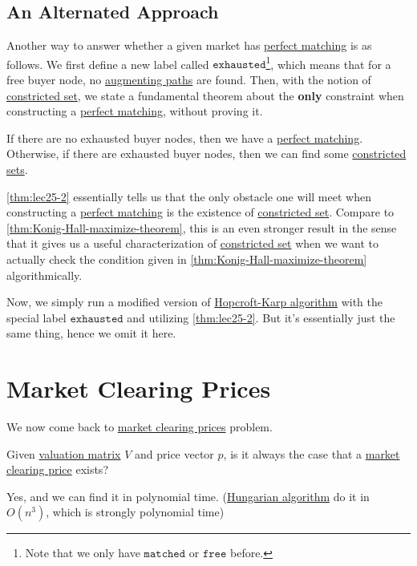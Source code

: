 \subsection{An Alternated Approach}
Another way to answer whether a given market has \hyperref[def:perfect-matching]{perfect matching} is as follows. We first define a new label called \(\mathtt{exhausted}\)\footnote{Note that we only have \(\mathtt{matched}\) or \(\mathtt{free}\) before.}, which means that for a free buyer node, no \hyperref[def:augmenting-path]{augmenting paths} are found. Then, with the notion of \hyperref[def:constricted-set]{constricted set}, we state a fundamental theorem about the \textbf{only} constraint when constructing a \hyperref[def:perfect-matching]{perfect matching}, without proving it.
\begin{theorem}\label{thm:lec25-2}
	If there are no exhausted buyer nodes, then we have a \hyperref[def:perfect-matching]{perfect matching}. Otherwise, if there are exhausted buyer nodes, then we can find some \hyperref[def:constricted-set]{constricted sets}.
\end{theorem}

\begin{remark}
	\autoref{thm:lec25-2} essentially tells us that the only obstacle one will meet when constructing a \hyperref[def:perfect-matching]{perfect matching} is the existence of \hyperref[def:constricted-set]{constricted set}. Compare to \autoref{thm:Konig-Hall-maximize-theorem}, this is an even stronger result in the sense that it gives us a useful characterization of \hyperref[def:constricted-set]{constricted set} when we want to actually check the condition given in \autoref{thm:Konig-Hall-maximize-theorem} algorithmically.
\end{remark}

Now, we simply run a modified version of \hyperref[algo:Hopcroft-Karp-algorithm]{Hopcroft-Karp algorithm} with the special label \(\mathtt{exhausted}\) and utilizing \autoref{thm:lec25-2}. But it's essentially just the same thing, hence we omit it here.

\section{Market Clearing Prices}
We now come back to \hyperref[note:market-clearing-prices]{market clearing prices} problem.

\begin{problem}
Given \hyperref[def:valuation-matrix]{valuation matrix} \(V\) and price vector \(p\), is it always the case that a \hyperref[note:market-clearing-prices]{market clearing price} exists?
\end{problem}
\begin{answer}
	Yes, and we can find it in polynomial time. (\href{https://en.wikipedia.org/wiki/Hungarian_algorithm}{Hungarian algorithm} do it in \(O(n^{3})\), which is strongly polynomial time)
\end{answer}


